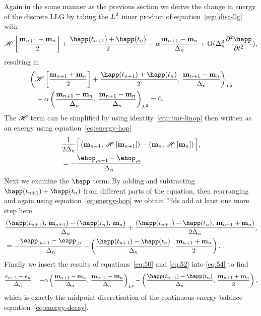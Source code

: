 Again in the same manner as the previous section we derive the change in energy of the discrete LLG by taking the $L^2$ inner product of equation~\eqref{eqn:disc-llg} with
\begin{equation}
  \mphop + \frac{\happ(t_{n+1}) + \happ(t_n)}{2} - \dampc \mpdmdt
  + \order{\dtn^2 \spd{\happ}{t}},
\end{equation}
resulting in
\begin{equation}
  \begin{aligned}
    &\ltip{\mphop + \frac{\happ(t_{n+1}) + \happ(t_n)}{2}}{\mpdmdt} \\
    & \quad - \dampc \ltip{\mpdmdt}{\mpdmdt} = 0.
    \label{eq:54}
  \end{aligned}
\end{equation}
The $\mathscr{H}$ term can be simplified by using identity~\eqref{eqn:imr-linop} then written as an energy using equation~\eqref{eq:energy-hop}
\begin{equation}
  \begin{aligned}
    &\frac{1}{2\dtn} \Big[\ip{\mv_{n+1}}{\hop \left[\mv_{n+1} \right]}
      - \ip{\mv_{n}}{ \hop\left[ \mv_{n} \right]} \Big], \\
    &= -\frac{\ehop_{,n+1} - \ehop_{,n}}{\dtn}.
  \end{aligned}
  \label{eq:50}
\end{equation}
Next we examine the $\happ$ term. By adding and subtracting $\happ(t_{n+1}) + \happ(t_n)$ from different parts of the equation, then rearranging and again using equation~\eqref{eq:energy-hop} we obtain
??ds add at least one more step here
\begin{equation}
  \begin{aligned}
    &\frac{ \ip{\happ(t_{n+1})}{\mv_{n+1}} - \ip{\happ(t_n)}{\mv_{n}}}{\dtn}
    + \frac{\ip{\happ(t_{n+1}) -\happ(t_n)}{\mv_{n+1} + \mv_{n}}}{2\dtn}, \\
    &= -\frac{\eapp_{, n+1} - \eapp_{, n}}{\dtn}
    - \ip{\frac{\happ(t_{n+1}) -\happ(t_n)}{\dtn}}{\frac{\mv_{n+1} + \mv_{n}}{2}}.
  \end{aligned}
  \label{eq:52}
\end{equation}
Finally we insert the results of equations~\eqref{eq:50} and \eqref{eq:52} into \eqref{eq:54} to find
\begin{equation}
  \frac{\e_{n+1} - \e_n}{\dtn}
  = -\dampc \ltip{\mpdmdt}{\mpdmdt}
  - \ip{\frac{\happ(t_{n+1}) -\happ(t_n)}{\dtn}}{\frac{\mv_{n+1} + \mv_{n}}{2}},
\label{eqn:imr-llg-energy}
\end{equation}
which is exactly the midpoint discretisation of the continuous energy balance equation~\eqref{eq:energy-decay}.

